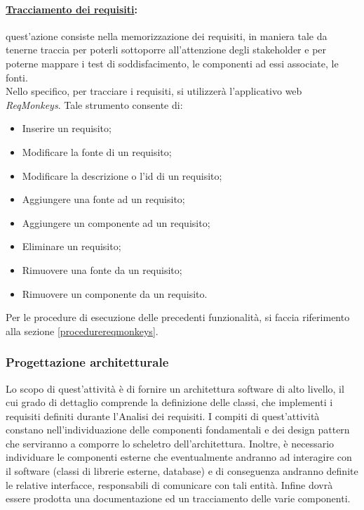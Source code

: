 \paragraph{\underline{Tracciamento dei requisiti}:} quest'azione consiste nella memorizzazione dei requisiti, in maniera tale da tenerne traccia per poterli sottoporre all'attenzione degli stakeholder e per poterne mappare i test di soddisfacimento, le componenti ad essi associate, le fonti.\\
Nello specifico, per tracciare i requisiti, si utilizzerà l'applicativo web \textit{ReqMonkeys}. Tale strumento consente di:
\begin{itemize}
\item Inserire un requisito;
\item Modificare la fonte di un requisito;
\item Modificare la descrizione o l'id di un requisito;
\item Aggiungere una fonte ad un requisito;
\item Aggiungere un componente ad un requisito;
\item Eliminare un requisito;
\item Rimuovere una fonte da un requisito;
\item Rimuovere un componente da un requisito.
\end{itemize}
Per le procedure di esecuzione delle precedenti funzionalità, si faccia riferimento alla sezione \ref{procedurereqmonkeys}.


\subsubsection{Progettazione architetturale}
\label{progarchitetturale}
Lo scopo di quest'attività è di fornire un architettura software di alto livello, il cui grado di dettaglio comprende la definizione delle classi, che implementi i requisiti definiti durante l'Analisi dei requisiti. I compiti di quest'attività constano nell'individuazione delle componenti fondamentali e dei design pattern\g{} che serviranno a comporre lo scheletro dell'architettura. Inoltre, è necessario individuare le componenti esterne che eventualmente andranno ad interagire con il software (classi di librerie esterne, database) e di conseguenza andranno definite le relative interfacce, responsabili di comunicare con tali entità. Infine dovrà essere prodotta una documentazione ed un tracciamento delle varie componenti.


